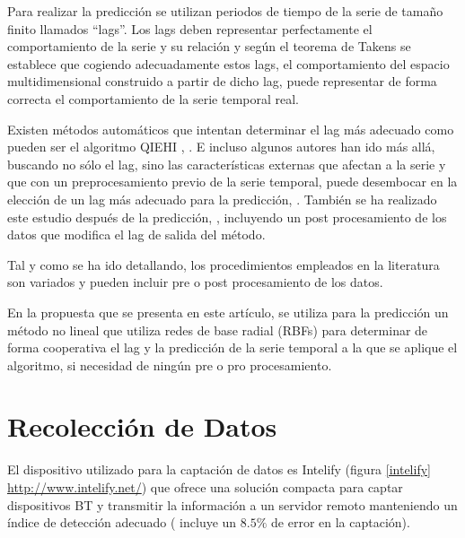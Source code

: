 \documentclass[runningheads]{llncs}
\begin{document}
Para realizar la predicción se utilizan periodos de tiempo de la serie de tamaño
finito llamados ``lags''. Los lags deben representar perfectamente el comportamiento de la serie y
su relación y según el teorema de Takens \cite{Takens1980} se establece que cogiendo adecuadamente
estos lags, el comportamiento del espacio multidimensional construido a partir de dicho lag, puede
representar de forma correcta el comportamiento de la serie temporal real. 

Existen métodos automáticos que intentan determinar el lag más adecuado como pueden ser el
algoritmo QIEHI \cite{Araujo2010a}, \cite{Araujo2010b}. E incluso
algunos autores han ido más allá, %
buscando no sólo el lag, sino las características externas que afectan a la serie y que con un
preprocesamiento previo de la serie temporal, puede desembocar en la elección de un lag  más
adecuado para la predicción, \cite{garcia2008}. También se ha realizado este estudio después de la
predicción,  \cite{Maus2011}, incluyendo un post procesamiento de los datos que modifica el lag de
salida del método. 

Tal y como se ha ido detallando, los procedimientos empleados en la literatura son variados y
pueden incluir pre o post procesamiento de los datos. %

En la propuesta que se presenta en este artículo, se utiliza para la predicción un método no
lineal que utiliza redes de base radial (RBFs) para determinar de forma cooperativa el lag y la
predicción de la serie temporal a la que se aplique el algoritmo, si necesidad de ningún pre o pro
procesamiento. %




\section{Recolección de Datos}
\label{sec:hw}

El dispositivo utilizado para la captación de datos es Intelify (figura 
\ref{intelify} \url{http://www.intelify.net/}) que ofrece una solución compacta para captar
dispositivos BT y transmitir la información a un servidor remoto manteniendo un índice de detección
adecuado ( incluye un $8.5\%$ de error en la captación).
\end{document}

